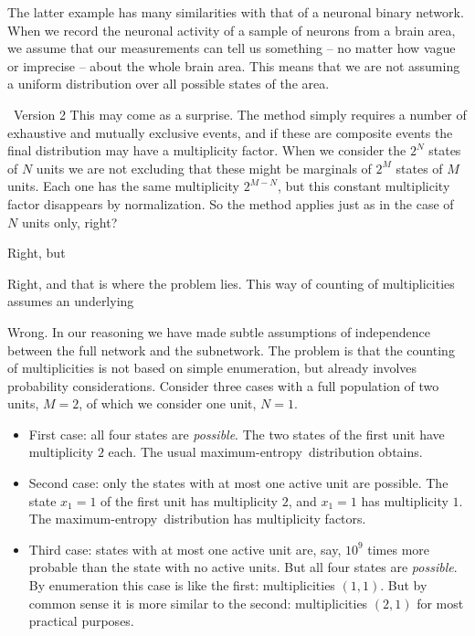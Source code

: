 \documentclass{article}
\newcommand*{\mynote}[1]{ {\color[RGB]{68,170,153}\maltese\ #1}}
\newcommand*{\yxx}{x}
\newcommand*{\yN}{N}
\newcommand*{\yM}{M}
\newcommand*{\me}{maximum-entropy}
\begin{document}
The latter example has many similarities with that of a neuronal binary
network. When we record the neuronal activity of a sample of neurons from a
brain area, we assume that our measurements can tell us something -- no
matter how vague or imprecise -- about the whole brain area. This means
that we are not assuming a uniform distribution over all possible states of
the area.




\mynote{Version 2}
This may come as a surprise. The method simply requires a number of
exhaustive and mutually exclusive events, and if these are composite events
the final distribution may have a multiplicity factor. When we consider the
$2^{\yN}$ states of $\yN$ units we are not excluding that these might be
marginals of $2^{\yM}$ states of $\yM$ units. Each one has the same
multiplicity $2^{\yM-\yN}$, but this constant multiplicity factor disappears
by normalization. So the method applies just as in the case of $\yN$ units
only, right?

Right, but 

Right, and that is where the problem lies. This way of counting of
multiplicities assumes an underlying 

Wrong. In our reasoning we have made subtle assumptions of independence
between the full network and the subnetwork. The problem is that the
counting of multiplicities is not based on simple enumeration, but already
involves probability considerations. Consider three cases with a full
population of two units, $\yM=2$, of which we consider one unit, $\yN=1$.
\begin{itemize}
\item First case: all four states are \emph{possible}. The two states of
  the first unit have multiplicity $2$ each. The usual \me\ distribution
  obtains.
\item Second case: only the states with at most one active unit are
  possible. The state $\yxx_1=1$ of the first unit has multiplicity
  $2$, and $\yxx_1=1$ has multiplicity $1$. The \me\ distribution has
  multiplicity factors.
\item Third case: states with at most one active unit are, say, $10^{9}$
  times more probable than the state with no active units. But all four
  states are \emph{possible}. By enumeration this case is like the first:
  multiplicities $(1,1)$. But by common sense it is more similar to the
  second: multiplicities $(2,1)$ for most practical purposes.
\end{itemize}
\end{document}
